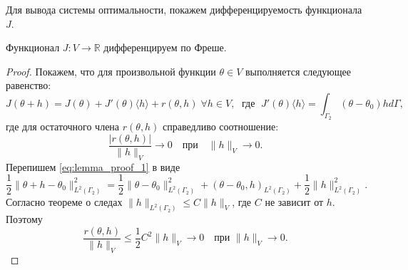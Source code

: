 Для вывода системы оптимальности, покажем дифференцируемость функционала $J$.
\begin{lem}
    \label{freshet_diff}
    Функционал $J : V \rightarrow \mathbb{R}$ дифференцируем по Фреше.
\end{lem}
\begin{proof}
    Покажем, что для произвольной функции $\theta \in V$ выполняется следующее равенство:
    \begin{equation}
        \label{eq:lemma_proof_1}
        J(\theta + h) = J(\theta) + J'(\theta)\langle h \rangle + r(\theta, h) \; \forall h \in V, \; \text{ где } \; J'(\theta)\langle h \rangle = \int_{\Gamma_2} (\theta - \theta_0)h d\Gamma,
    \end{equation}
    где для остаточного члена $r(\theta,h)$ справедливо соотношение:
    \begin{equation}
        \label{lemma_proof_2} \frac{|r(\theta,h)|}{\|h\|_V} \rightarrow 0 \quad \text{при} \quad \|h\|_V \rightarrow 0.
    \end{equation}
    Перепишем \eqref{eq:lemma_proof_1} в виде
    \[
        \frac{1}{2} \|\theta + h - \theta_0\|^2_{L^2(\Gamma_2)} =
        \frac{1}{2} \| \theta - \theta_0 \|^2_{L^2(\Gamma_2)} +
        (\theta - \theta_0, h)_{L^2(\Gamma_2)} +
        \frac{1}{2}\| h \|^2_{L^2(\Gamma_2)}.
    \]
    Согласно теореме о следах $ \|h\|_{L^2(\Gamma_2)} \le C \|h\|_V $, где $C$ не зависит от $h$. Поэтому
    \[
        \frac{r(\theta,h)}{\| h \|_V} \leq
        \frac{1}{2} C^2 \| h \|_V \rightarrow 0 \quad \text{при } \| h \|_V \rightarrow 0.
    \]
\end{proof}


